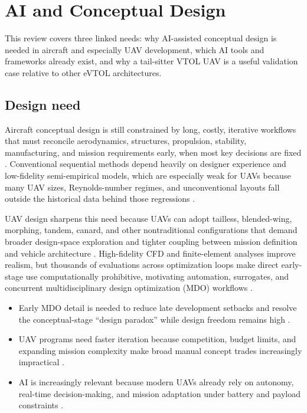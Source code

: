 \section{AI and Conceptual Design}
\label{sec:related}

This review covers three linked needs: why AI-assisted conceptual
design is needed in aircraft and especially UAV development, which AI
tools and frameworks already exist, and why a tail-sitter VTOL UAV is a
useful validation case relative to other eVTOL architectures.

\subsection{Design need}

Aircraft conceptual design is still constrained by long, costly,
iterative workflows that must reconcile aerodynamics, structures,
propulsion, stability, manufacturing, and mission requirements early,
when most key decisions are fixed
\citep{karali2024surrogate,corrado2022,lukyanov2024}. Conventional
sequential methods depend heavily on designer experience and
low-fidelity semi-empirical models, which are especially weak for UAVs
because many UAV sizes, Reynolds-number regimes, and unconventional
layouts fall outside the historical data behind those regressions
\citep{karali2024surrogate,lukyanov2024}.

UAV design sharpens this need because UAVs can adopt tailless,
blended-wing, morphing, tandem, canard, and other nontraditional
configurations that demand broader design-space exploration and tighter
coupling between mission definition and vehicle architecture
\citep{karali2024surrogate,ivanova2025,lukyanov2024}. High-fidelity CFD
and finite-element analyses improve realism, but thousands of
evaluations across optimization loops make direct early-stage use
computationally prohibitive, motivating automation, surrogates, and
concurrent multidisciplinary design optimization (MDO) workflows
\citep{karali2024surrogate,wang2023,pliakos2025,leng2024}.

\begin{itemize}[nosep]
\item Early MDO detail is needed to reduce late development setbacks
  and resolve the conceptual-stage ``design paradox'' while design
  freedom remains high \citep{corrado2022}.
\item UAV programs need faster iteration because competition, budget
  limits, and expanding mission complexity make broad manual concept
  trades increasingly impractical
  \citep{karali2023,pliakos2025,shakeri2018}.
\item AI is increasingly relevant because modern UAVs already rely on
  autonomy, real-time decision-making, and mission adaptation under
  battery and payload constraints
  \citep{ivanova2025,sai2023,mcenroe2022}.
\end{itemize}

